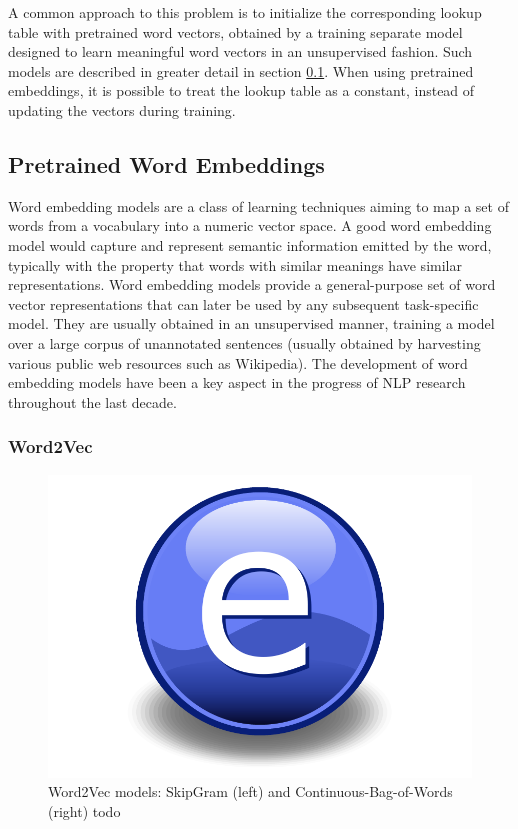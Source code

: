A common approach to this problem is to initialize the corresponding lookup table with pretrained word vectors, obtained by a training separate model designed to learn meaningful word vectors in an unsupervised fashion. Such models are described in greater detail in section \ref{section:wordembeddings}. When using pretrained embeddings, it is possible to treat the lookup table as a constant, instead of updating the vectors during training. 

\subsection{Pretrained Word Embeddings} \label{section:wordembeddings}
Word embedding models are a class of learning techniques aiming to map a set of words from a vocabulary into a numeric vector space. A good word embedding model would capture and represent semantic information emitted by the word, typically with the property that words with similar meanings have similar representations. Word embedding models provide a general-purpose set of word vector representations that can later be used by any subsequent task-specific model. They are usually obtained in an unsupervised manner, training a model over a large corpus of unannotated sentences (usually obtained by harvesting various public web resources such as Wikipedia). The development of word embedding models have been a key aspect in the progress of NLP research throughout the last decade.

\subsubsection{Word2Vec}

\begin{figure}
    \centering
    \includegraphics{Figures/Electron.pdf}
    \caption{Word2Vec models: SkipGram (left) and Continuous-Bag-of-Words (right) todo}
    \label{fig:word2vec}
\end{figure}

